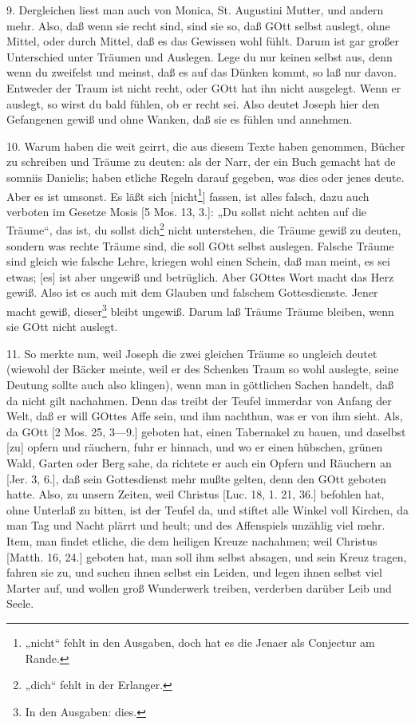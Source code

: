 9. Dergleichen liest man auch von Monica, St. Augustini Mutter, und andern mehr. Also, daß wenn sie recht sind, sind sie so, daß GOtt selbst auslegt, ohne Mittel, oder durch Mittel, daß es das Gewissen wohl fühlt. Darum ist gar großer Unterschied unter Träumen und Auslegen. Lege du nur keinen selbst aus, denn wenn du zweifelst und meinst, daß es auf das Dünken kommt, so laß nur davon. Entweder der Traum ist nicht recht, oder GOtt hat ihn nicht ausgelegt. Wenn er auslegt, so wirst du bald fühlen, ob er recht sei. Also deutet Joseph hier den Gefangenen gewiß und ohne Wanken, daß sie es fühlen und annehmen.

10. Warum haben die weit geirrt, die aus diesem Texte haben genommen, Bücher zu schreiben und Träume zu deuten: als der Narr, der ein Buch gemacht hat de somniis Danielis; haben etliche Regeln darauf gegeben, was dies oder jenes deute. Aber es ist umsonst. Es läßt sich [nicht\footnote{„nicht“ fehlt in den Ausgaben, doch hat es die Jenaer als Conjectur am Rande.}] fassen, ist alles falsch, dazu auch verboten im Gesetze Mosis [5 Mos. 13, 3.]: „Du sollst nicht achten auf die Träume“, das ist, du sollst dich\footnote{„dich“ fehlt in der Erlanger.} nicht unterstehen, die Träume gewiß zu deuten, sondern was rechte Träume sind, die soll GOtt selbst auslegen. Falsche Träume sind gleich wie falsche Lehre, kriegen wohl einen Schein, daß man meint, es sei etwas; [es] ist aber ungewiß und betrüglich. Aber GOttes Wort macht das Herz gewiß. Also ist es auch mit dem Glauben und falschem Gottesdienste. Jener macht gewiß, dieser\footnote{In den Ausgaben: dies.} bleibt ungewiß. Darum laß Träume Träume bleiben, wenn sie GOtt nicht auslegt.

11. So merkte nun, weil Joseph die zwei
gleichen Träume so ungleich deutet (wiewohl der Bäcker meinte, weil er des Schenken Traum so wohl auslegte, seine Deutung sollte auch also klingen), wenn man in göttlichen Sachen handelt, daß da nicht gilt nachahmen. Denn das treibt der Teufel immerdar von Anfang der Welt, daß er will GOttes Affe sein, und ihm nachthun, was er von ihm sieht. Als, da GOtt [2 Mos. 25, 3—9.] geboten hat, einen Tabernakel zu bauen, und daselbst [zu] opfern und räuchern, fuhr er hinnach, und wo er einen hübschen, grünen Wald, Garten oder Berg sahe, da richtete er auch ein Opfern und Räuchern an [Jer. 3, 6.], daß sein Gottesdienst mehr mußte gelten, denn den GOtt geboten hatte. Also, zu unsern Zeiten, weil Christus [Luc. 18, 1. 21, 36.] befohlen hat, ohne Unterlaß zu bitten, ist der Teufel da, und stiftet alle Winkel voll Kirchen, da man Tag und Nacht plärrt und heult; und des Affenspiels unzählig viel mehr. Item, man findet etliche, die dem heiligen Kreuze nachahmen; weil Christus [Matth. 16, 24.] geboten hat, man soll ihm selbst absagen, und sein Kreuz tragen, fahren sie zu, und suchen ihnen selbst ein Leiden, und legen ihnen selbst viel Marter auf, und wollen groß Wunderwerk treiben, verderben darüber Leib und Seele.

